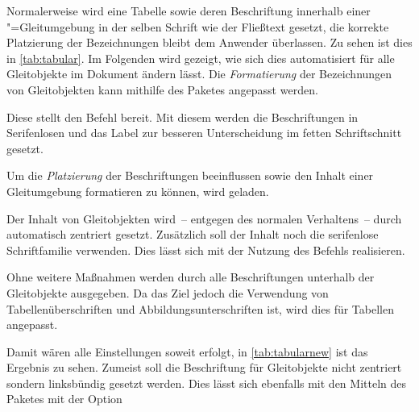 \documentclass[%
  english,ngerman,%
  geometry=no,DIV=12,automark,%
]{tudscrartcl}
\begin{document}
Normalerweise wird eine Tabelle sowie deren Beschriftung innerhalb einer 
"=Gleitumgebung in der selben Schrift wie der Fließtext 
gesetzt, die korrekte Platzierung der Bezeichnungen bleibt dem Anwender 
überlassen. Zu sehen ist dies in \autoref{tab:tabular}. Im Folgenden wird 
gezeigt, wie sich dies automatisiert für alle Gleitobjekte im Dokument ändern 
lässt. Die \emph{Formatierung} der Bezeichnungen von Gleitobjekten kann 
mithilfe des Paketes  angepasst werden.
%
\begin{Preamble}
\usepackage{caption}
\end{Preamble}
%
Diese stellt den Befehl  bereit. Mit diesem werden die 
Beschriftungen in Serifenlosen und das Label zur besseren Unterscheidung im 
fetten Schriftschnitt gesetzt.
%
\begin{Preamble*}
\captionsetup{font=sf,labelfont=bf,labelsep=space}
\end{Preamble*}
%
Um die \emph{Platzierung} der Beschriftungen beeinflussen sowie den Inhalt 
einer Gleitumgebung formatieren zu können, wird  geladen. 
\begin{Preamble}
\usepackage{floatrow}
\end{Preamble}
%
Der Inhalt von Gleitobjekten wird~-- entgegen des normalen Verhaltens~-- durch 
 automatisch zentriert gesetzt. Zusätzlich soll der Inhalt 
noch die serifenlose Schriftfamilie verwenden. Dies lässt sich mit der Nutzung 
des Befehls  realisieren.
%
\begin{Preamble*}
\end{Preamble*}
%
Ohne weitere Maßnahmen werden durch  alle Beschriftungen 
unterhalb der Gleitobjekte ausgegeben. Da das Ziel jedoch die Verwendung von 
Tabellenüberschriften und Abbildungsunterschriften ist, wird dies für Tabellen
angepasst.
%
\begin{Preamble*}
\end{Preamble*}
%
\begin{table}
\end{table}%
%
Damit wären alle Einstellungen soweit erfolgt, in \autoref{tab:tabularnew} ist 
das Ergebnis zu sehen. Zumeist soll die Beschriftung für Gleitobjekte nicht 
zentriert sondern linksbündig gesetzt werden. Dies lässt sich ebenfalls mit den 
Mitteln des Paketes  mit der Option  
\end{document}
